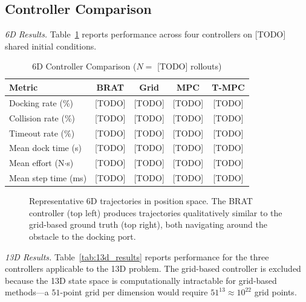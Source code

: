 \documentclass[letterpaper, 10 pt, conference]{ieeeconf}
\begin{document}
\subsection{Controller Comparison}

\textit{6D Results.}
Table~\ref{tab:6d_results} reports performance across four controllers on [TODO] shared initial conditions.

\begin{table}[t]
\caption{6D Controller Comparison ($N = $ [TODO] rollouts)}
\label{tab:6d_results}
\centering
\begin{tabular}{lcccc}
\toprule
Metric & BRAT & Grid & MPC & T-MPC \\
\midrule
Docking rate (\%) & [TODO] & [TODO] & [TODO] & [TODO] \\
Collision rate (\%) & [TODO] & [TODO] & [TODO] & [TODO] \\
Timeout rate (\%) & [TODO] & [TODO] & [TODO] & [TODO] \\
Mean dock time (s) & [TODO] & [TODO] & [TODO] & [TODO] \\
Mean effort (N$\cdot$s) & [TODO] & [TODO] & [TODO] & [TODO] \\
Mean step time (ms) & [TODO] & [TODO] & [TODO] & [TODO] \\
\bottomrule
\end{tabular}
\end{table}

   \begin{figure}[t]
      \centering
      \caption{Representative 6D trajectories in position space. The BRAT controller (top left) produces trajectories qualitatively similar to the grid-based ground truth (top right), both navigating around the obstacle to the docking port.}
      \label{fig:6d_trajectories}
   \end{figure}

\textit{13D Results.}
Table~\ref{tab:13d_results} reports performance for the three controllers applicable to the 13D problem. The grid-based controller is excluded because the 13D state space is computationally intractable for grid-based methods---a $51$-point grid per dimension would require $51^{13} \approx 10^{22}$ grid points.
\end{document}
